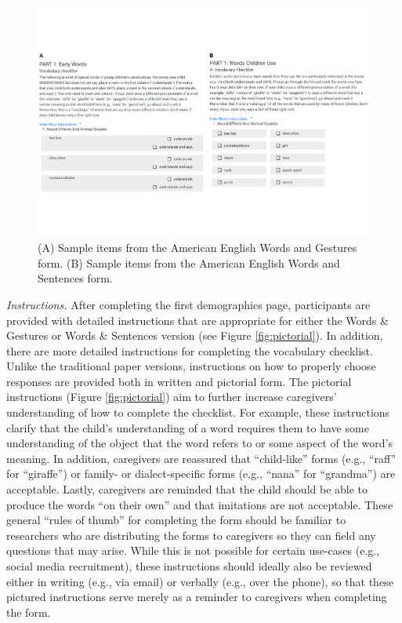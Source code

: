 \documentclass[
  english,
  ,man,floatsintext]{apa6}
\begin{document}
\begin{figure}
\centering
\includegraphics{webcdi_paper_files/figure-latex/firstitems-1.pdf}
\caption{\label{fig:firstitems}(A) Sample items from the American English Words and Gestures form. (B) Sample items from the American English Words and Sentences form.}
\end{figure}

\emph{Instructions.} After completing the first demographics page, participants are provided with detailed instructions that are appropriate for either the Words \& Gestures or Words \& Sentences version (see Figure \ref{fig:pictorial}). In addition, there are more detailed instructions for completing the vocabulary checklist. Unlike the traditional paper versions, instructions on how to properly choose responses are provided both in written and pictorial form. The pictorial instructions (Figure \ref{fig:pictorial}) aim to further increase caregivers' understanding of how to complete the checklist. For example, these instructions clarify that the child's understanding of a word requires them to have some understanding of the object that the word refers to or some aspect of the word's meaning. In addition, caregivers are reassured that \enquote{child-like} forms (e.g., \enquote{raff} for \enquote{giraffe}) or family- or dialect-specific forms (e.g., \enquote{nana} for \enquote{grandma}) are acceptable. Lastly, caregivers are reminded that the child should be able to produce the words \enquote{on their own} and that imitations are not acceptable. These general \enquote{rules of thumb} for completing the form should be familiar to researchers who are distributing the forms to caregivers so they can field any questions that may arise. While this is not possible for certain use-cases (e.g., social media recruitment), these instructions should ideally also be reviewed either in writing (e.g., via email) or verbally (e.g., over the phone), so that these pictured instructions serve merely as a reminder to caregivers when completing the form.
\end{document}
